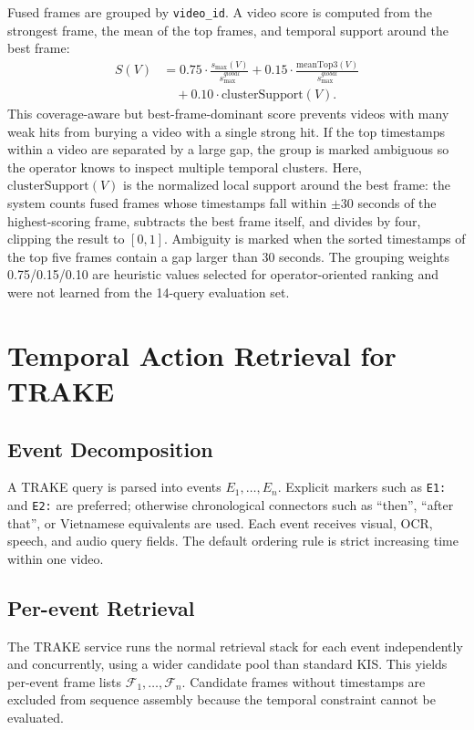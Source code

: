 \documentclass[conference]{IEEEtran}
\newcommand{\vid}{\texttt{video\_id}}
\begin{document}
Fused frames are grouped by \vid{}. A video score is computed from the strongest
frame, the mean of the top frames, and temporal support around the best frame:
\[
\begin{split}
  S(V) &= 0.75 \cdot \frac{s_{\max}(V)}{s_{\max}^{global}}
       + 0.15 \cdot \frac{\mathrm{meanTop3}(V)}{s_{\max}^{global}}\\
       &\quad + 0.10 \cdot \mathrm{clusterSupport}(V).
\end{split}
\]
This coverage-aware but best-frame-dominant score prevents videos with many weak
hits from burying a video with a single strong hit. If the top timestamps within
a video are separated by a large gap, the group is marked ambiguous so the
operator knows to inspect multiple temporal clusters.
Here, $\mathrm{clusterSupport}(V)$ is the normalized local support around the
best frame: the system counts fused frames whose timestamps fall within
$\pm 30$ seconds of the highest-scoring frame, subtracts the best frame itself,
and divides by four, clipping the result to $[0,1]$. Ambiguity is marked when
the sorted timestamps of the top five frames contain a gap larger than 30
seconds. The grouping weights 0.75/0.15/0.10 are heuristic values selected for
operator-oriented ranking and were not learned from the 14-query evaluation
set.

\section{Temporal Action Retrieval for TRAKE}

\subsection{Event Decomposition}

A TRAKE query is parsed into events $E_1,\dots,E_n$. Explicit markers such as
\texttt{E1:} and \texttt{E2:} are preferred; otherwise chronological connectors
such as ``then'', ``after that'', or Vietnamese equivalents are used. Each event
receives visual, OCR, speech, and audio query fields. The default ordering rule
is strict increasing time within one video.

\subsection{Per-event Retrieval}

The TRAKE service runs the normal retrieval stack for each event independently
and concurrently, using a wider candidate pool than standard KIS. This yields
per-event frame lists $\mathcal{F}_1,\dots,\mathcal{F}_n$. Candidate frames
without timestamps are excluded from sequence assembly because the temporal
constraint cannot be evaluated.
\end{document}
